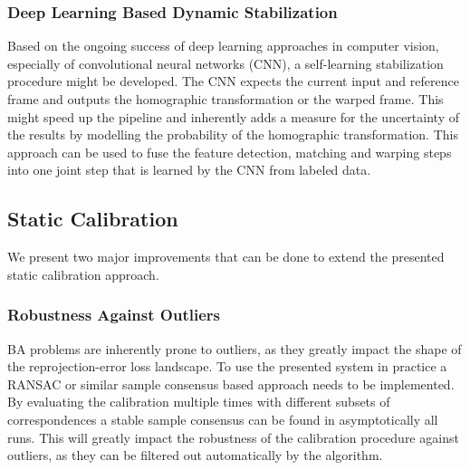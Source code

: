 \subsubsection{Deep Learning Based Dynamic Stabilization}
Based on the ongoing success of deep learning approaches in computer vision, especially of convolutional neural networks (CNN), a self-learning stabilization procedure might be developed.
The CNN expects the current input and reference frame and outputs the homographic transformation or the warped frame. 
This might speed up the pipeline and inherently adds a measure for the uncertainty of the results by modelling the probability of the homographic transformation.
This approach can be used to fuse the feature detection, matching and warping steps into one joint step that is learned by the CNN from labeled data.


\subsection{Static Calibration}
We present two major improvements that can be done to extend the presented static calibration approach.

\subsubsection{Robustness Against Outliers}
BA problems are inherently prone to outliers, as they greatly impact the shape of the reprojection-error loss landscape. 
To use the presented system in practice a RANSAC \cite{fischler1981random} or similar sample consensus based approach needs to be implemented.
By evaluating the calibration multiple times with different subsets of correspondences a stable sample consensus can be found in asymptotically all runs.
This will greatly impact the robustness of the calibration procedure against outliers, as they can be filtered out automatically by the algorithm.  


